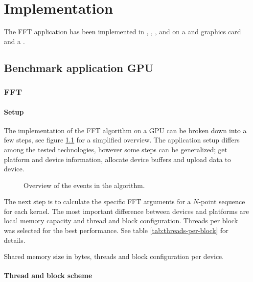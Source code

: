 \chapter{Implementation}\label{cha:implementation}

The \gls{FFT} application has been implemented in {\CPP}, {\CU}, {\OCL}, {\DX} and {\GL} on a {\NVCARD} and {\AMDCARD} graphics card and a {\INTELCPU}.

\section{Benchmark application GPU}

\subsection{FFT}

\subsubsection{Setup}

The implementation of the \gls{FFT} algorithm on a \gls{GPU} can be broken down into a few steps, see figure \ref{fig:algorithm-overview} for a simplified overview. The application setup differs among the tested technologies, however some steps can be generalized; get platform and device information, allocate device buffers and upload data to device.
\begin{figure}
	\centering
	
	\caption{Overview of the events in the algorithm.}
	\label{fig:algorithm-overview}
\end{figure}

The next step is to calculate the specific \gls{FFT} arguments for a $N$-point sequence for each kernel. The most important difference between devices and platforms are local memory capacity and thread and block configuration. Threads per block was selected for the best performance. See table \ref{tab:threads-per-block} for details.
\begin{table}
	\centering
	
	\caption{Shared memory size in bytes, threads and block configuration per device.}
	\label{tab:threads-per-block}
\end{table}

\subsubsection{Thread and block scheme}

